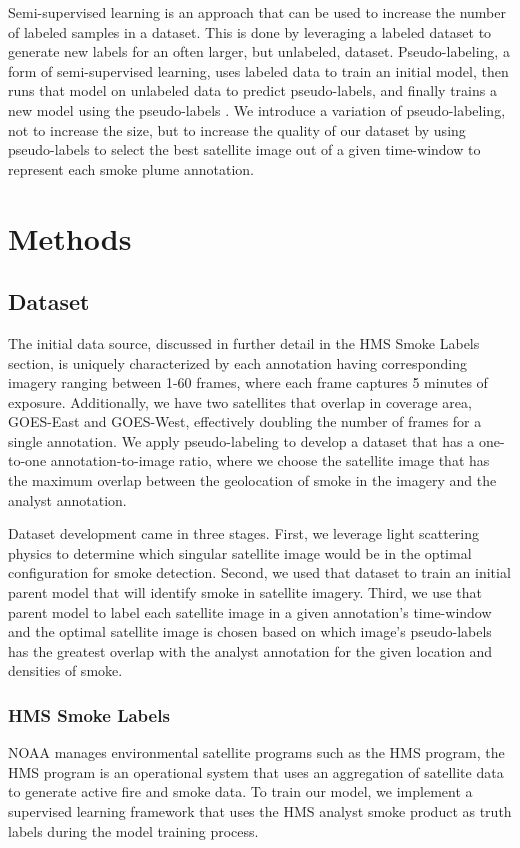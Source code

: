 \documentclass{article}
\begin{document}
Semi-supervised learning is an approach that can be used to increase the number of labeled samples in a dataset. This is done by leveraging a labeled dataset to generate new labels for an often larger, but unlabeled, dataset. Pseudo-labeling, a form of semi-supervised learning, uses labeled data to train an initial model, then runs that model on unlabeled data to predict pseudo-labels, and finally trains a new model using the pseudo-labels \cite{pseudo}. We introduce a variation of pseudo-labeling, not to increase the size, but to increase the quality of our dataset by using pseudo-labels to select the best satellite image out of a given time-window to represent each smoke plume annotation.


\section{Methods}
\subsection*{Dataset}

The initial data source, discussed in further detail in the HMS Smoke Labels section, is uniquely characterized by each annotation having corresponding imagery ranging between 1-60 frames, where each frame captures 5 minutes of exposure.  Additionally, we have two satellites that overlap in coverage area, GOES-East and GOES-West, effectively doubling the number of frames for a single annotation. We apply pseudo-labeling to develop a dataset that has a one-to-one annotation-to-image ratio, where we choose the satellite image that has the maximum overlap between the geolocation of smoke in the imagery and the analyst annotation.

Dataset development came in three stages. First, we leverage light scattering physics to determine which singular satellite image would be in the optimal configuration for smoke detection. Second, we used that dataset to train an initial parent model that will identify smoke in satellite imagery. Third, we use that parent model to label each satellite image in a given annotation's time-window and the optimal satellite image is chosen based on which image's pseudo-labels has the greatest overlap with the analyst annotation for the given location and densities of smoke.

\subsubsection*{HMS Smoke Labels} 
NOAA manages environmental satellite programs such as the HMS program, the HMS program is an operational system that uses an aggregation of satellite data to generate active fire and smoke data. To train our model, we implement a supervised learning framework that uses the HMS analyst smoke product as truth labels during the model training process.
\end{document}
